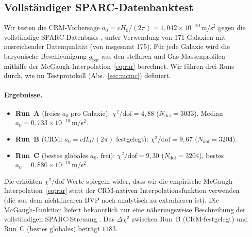 \documentclass[aps,prd,twocolumn,superscriptaddress,nofootinbib]{revtex4-2}
\begin{document}
\subsection{Vollst\"andiger SPARC-Datenbanktest}
\label{sec:sparc_results}

Wir testen die CRM-Vorhersage $a_0 = cH_0/(2\pi) = 1{,}042 \times 10^{-10}$\,m/s$^2$ gegen die vollst\"andige SPARC-Datenbasis \cite{Lelli2016}, unter Verwendung von 171 Galaxien mit ausreichender Datenqualit\"at (von insgesamt 175). F\"ur jede Galaxie wird die baryonische Beschleunigung $g_{\mathrm{bar}}$ aus den stellaren und Gas-Massenprofilen mithilfe der McGaugh-Interpolation~\eqref{eq:rar} berechnet. Wir f\"uhren drei Runs durch, wie im Testprotokoll (Abs.~\ref{sec:mcmc}) definiert.

\paragraph{Ergebnisse.}
\begin{itemize}
\item \textbf{Run~A} (freies $a_0$ pro Galaxie): $\chi^2/\mathrm{dof} = 4{,}88$ ($N_{\mathrm{dof}} = 3033$), Median $a_0 = 0{,}733 \times 10^{-10}$\,m/s$^2$.
\item \textbf{Run~B} (CRM: $a_0 = cH_0/(2\pi)$ festgelegt): $\chi^2/\mathrm{dof} = 9{,}67$ ($N_{\mathrm{dof}} = 3204$).
\item \textbf{Run~C} (bestes globales $a_0$, frei): $\chi^2/\mathrm{dof} = 9{,}30$ ($N_{\mathrm{dof}} = 3204$), bestes $a_0 = 0{,}880 \times 10^{-10}$\,m/s$^2$.
\end{itemize}

Die erh\"ohten $\chi^2/\mathrm{dof}$-Werte spiegeln wider, dass wir die empirische McGaugh-Interpolation~\eqref{eq:rar} statt der CRM-nativen Interpolationsfunktion verwenden (die aus dem nichtlinearen BVP noch analytisch zu extrahieren ist). Die McGaugh-Funktion liefert bekanntlich nur eine n\"aherungsweise Beschreibung der vollst\"andigen SPARC-Streuung \cite{Li2018}. Das $\Delta\chi^2$ zwischen Run~B (CRM-festgelegt) und Run~C (bestes globales) betr\"agt $1183$.
\end{document}

